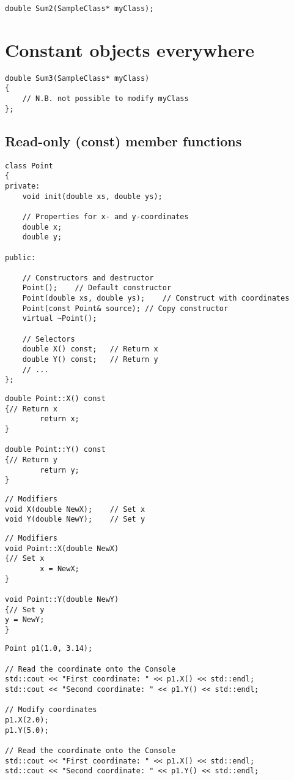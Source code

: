 \begin{lstlisting}
double Sum2(SampleClass* myClass);
\end{lstlisting}

\section{Constant objects everywhere}

\begin{lstlisting}
double Sum3(SampleClass* myClass)
{
	// N.B. not possible to modify myClass
};
\end{lstlisting}

\subsection{Read-only (const) member functions}

\begin{lstlisting}
class Point
{
private:
	void init(double xs, double ys);

	// Properties for x- and y-coordinates
	double x;
	double y;

public:

	// Constructors and destructor
	Point();	// Default constructor
	Point(double xs, double ys);	// Construct with coordinates
	Point(const Point& source);	// Copy constructor
	virtual ~Point();

	// Selectors
	double X() const;	// Return x
	double Y() const;	// Return y
	// ...
};
\end{lstlisting}

\begin{lstlisting}
double Point::X() const
{// Return x
		return x;
}

double Point::Y() const
{// Return y
		return y;
}
\end{lstlisting}

\begin{lstlisting}
// Modifiers
void X(double NewX);	// Set x
void Y(double NewY);	// Set y
\end{lstlisting}

\begin{lstlisting}
// Modifiers
void Point::X(double NewX)
{// Set x
		x = NewX;
}

void Point::Y(double NewY)
{// Set y
y = NewY;
}
\end{lstlisting}

\begin{lstlisting}
Point p1(1.0, 3.14);

// Read the coordinate onto the Console
std::cout << "First coordinate: " << p1.X() << std::endl;
std::cout << "Second coordinate: " << p1.Y() << std::endl;

// Modify coordinates
p1.X(2.0);
p1.Y(5.0);

// Read the coordinate onto the Console
std::cout << "First coordinate: " << p1.X() << std::endl;
std::cout << "Second coordinate: " << p1.Y() << std::endl;
\end{lstlisting}

